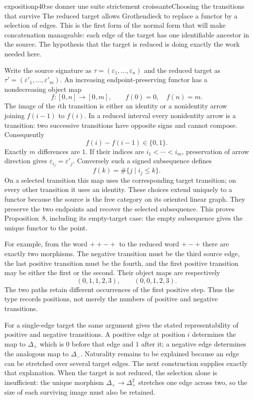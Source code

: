 \begin{dcomment}{exposition}{p40:se donner une suite strictement croissante}{Choosing the transitions that survive}
The reduced target allows Grothendieck to replace a functor by a selection of edges. This is the first form of the normal form that will make concatenation manageable: each edge of the target has one identifiable ancestor in the source. The hypothesis that the target is reduced is doing exactly the work needed here.

Write the source signature as $\tau=(\varepsilon_1,\ldots,\varepsilon_n)$ and the reduced target as $\tau'=(\varepsilon'_1,\ldots,\varepsilon'_m)$. An increasing endpoint-preserving functor has a nondecreasing object map
\[
 f:[0,n]\longrightarrow[0,m],\qquad f(0)=0,\quad f(n)=m.
\]
The image of the $i$th transition is either an identity or a nonidentity arrow joining $f(i-1)$ to $f(i)$. In a reduced interval every nonidentity arrow is a transition: two successive transitions have opposite signs and cannot compose. Consequently
\[
 f(i)-f(i-1)\in\{0,1\}.
\]
Exactly $m$ differences are $1$. If their indices are $i_1<\cdots<i_m$, preservation of arrow direction gives $\varepsilon_{i_j}=\varepsilon'_j$. Conversely such a signed subsequence defines
\[
 f(k)=\#\{j\mid i_j\leq k\}.
\]
On a selected transition this map uses the corresponding target transition; on every other transition it uses an identity. These choices extend uniquely to a functor because the source is the free category on its oriented linear graph. They preserve the two endpoints and recover the selected subsequence. This proves Proposition~8, including its empty-target case: the empty subsequence gives the unique functor to the point.

For example, from the word $++-+$ to the reduced word $+-+$ there are exactly two morphisms. The negative transition must be the third source edge, the last positive transition must be the fourth, and the first positive transition may be either the first or the second. Their object maps are respectively
\[
 (0,1,1,2,3),\qquad (0,0,1,2,3).
\]
The two paths retain different occurrences of the first positive step. Thus the type records positions, not merely the numbers of positive and negative transitions.

For a single-edge target the same argument gives the stated representability of positive and negative transitions. A positive edge at position $i$ determines the map to $\Delta_+$ which is $0$ before that edge and $1$ after it; a negative edge determines the analogous map to $\Delta_-$. Naturality remains to be explained because an edge can be stretched over several target edges. The next construction supplies exactly that explanation. When the target is not reduced, the selection alone is insufficient: the unique morphism $\Delta_+\to\Delta_+^2$ stretches one edge across two, so the size of each surviving image must also be retained.
\end{dcomment}

